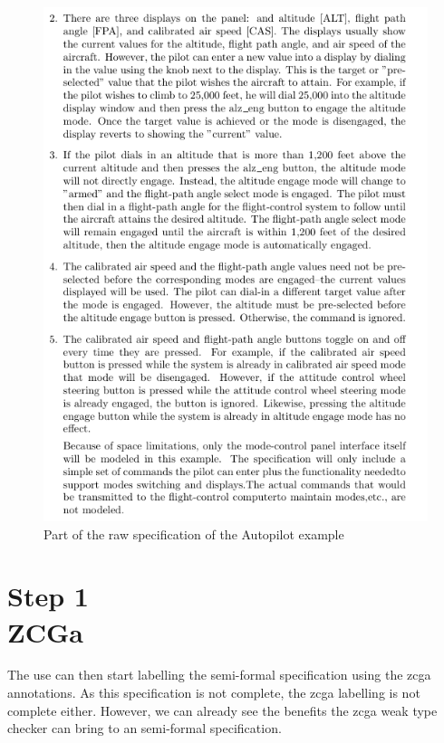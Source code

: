 \begin{figure}[H]
\begin{minipage}{0.45\textwidth}
    \includegraphics[width=\textwidth]{Figures/fullexample/0auto2.png}
    \end{minipage}
    \caption{Part of the raw specification of the Autopilot example \label{fig:rawautocomp}}
    \end{figure}



 \section{Step 1\\ZCGa}

 The use can then start labelling the semi-formal specification using the
 \gls{zcga} annotations. As this specification is not complete, the \gls{zcga}
 labelling is not complete either. However, we can already see the benefits the
 \gls{zcga} weak type checker can bring to an semi-formal specification.

